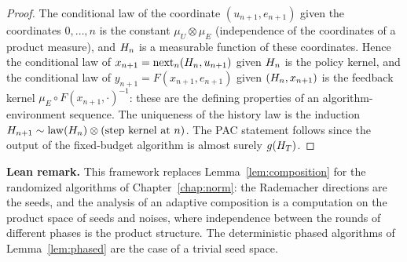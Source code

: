 \begin{proof}
\leanok
{}
The conditional law of the coordinate $(u_{n+1}, e_{n+1})$ given the coordinates
$0, \dots, n$ is the constant $\mu_U \otimes \mu_E$ (independence of the coordinates of a
product measure), and $H_n$ is a measurable function of these coordinates. Hence the
conditional law of $x_{n+1} = \mathrm{next}_n(H_n, u_{n+1})$ given $H_n$ is the
policy kernel, and the conditional law of $y_{n+1} = F(x_{n+1}, e_{n+1})$ given
$(H_n, x_{n+1})$ is the feedback kernel $\mu_E \circ F(x_{n+1}, \cdot)^{-1}$: these are the
defining properties of an algorithm-environment sequence. The uniqueness of the history law
is the induction $H_{n+1} \sim \mathrm{law}(H_n) \otimes (\text{step kernel at } n)$.
The PAC statement follows since the output of the fixed-budget algorithm is almost surely
$g(H_T)$.
\end{proof}

\textbf{Lean remark.} This framework replaces Lemma~\ref{lem:composition} for the randomized
algorithms of Chapter~\ref{chap:norm}: the Rademacher directions are the seeds, and the
analysis of an adaptive composition is a computation on the product space of seeds and
noises, where independence between the rounds of different phases is the product structure.
The deterministic phased algorithms of Lemma~\ref{lem:phased} are the case of a trivial seed
space.

